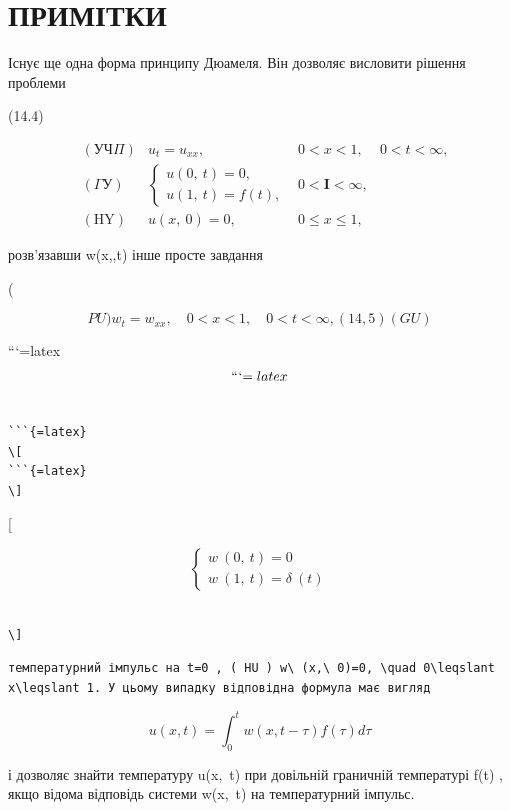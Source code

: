 \documentclass[
  ukrainian,
]{article}
\begin{document}
\section{ПРИМІТКИ}\label{ux43fux440ux438ux43cux456ux442ux43aux438-3}

Існує ще одна форма принципу Дюамеля. Він дозволяє висловити рішення
проблеми

(14.4)

\[
\begin{aligned} & (\text{УЧ}\Pi) & u_t = u_{xx}, & 0 < x < 1, & 0 < t < \infty, \\ & \left( \Gamma \text{У} \right) & \begin{cases} u \left( 0, \ t \right) = 0, \\ u \left( 1, \ t \right) = f \left( t \right), \end{cases} & 0 < \textbf{I} < \infty, \\ & (\text{HY}) & u \left( x, \ 0 \right) = 0, & 0 \leqslant x \leqslant 1, \end{aligned}
\]

розв'язавши w\left(x,,t\right) інше просте завдання

(

\[
PU ) w_t=w_{xx}, \quad 0< x<1, \quad 0< t<\infty, ( 14,5 ) ( GU )
\]

```{=latex}
\[
```{=latex}
\]

\begin{verbatim}

```{=latex}
\[
```{=latex}
\]
\end{verbatim}

{[}

\[
\begin{cases} w\ (0,\ t)=0 \\ w\ (1,\ t)=\delta\ (t) \end{cases}
\]

\begin{verbatim}

\]
\end{verbatim}

\begin{verbatim}
температурний імпульс на t=0 , ( HU ) w\ (x,\ 0)=0, \quad 0\leqslant x\leqslant 1. У цьому випадку відповідна формула має вигляд
\end{verbatim}

\[
u(x, t) = \int_{0}^{t} w(x, t-\tau) f(\tau) d\tau
\]

і дозволяє знайти температуру u\left(x,~t\right) при довільній граничній
температурі f\left(t\right) , якщо відома відповідь системи
w\left(x,~t\right) на температурний імпульс.
\end{document}
